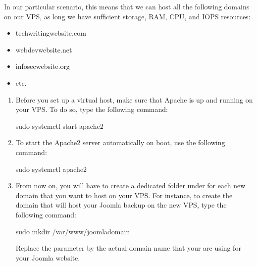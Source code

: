 \documentclass[letterpaper,10pt,english]{sphinxmanual}
\begin{document}
\sphinxAtStartPar
In our particular scenario, this means that we can host all the following domains on our VPS, as long we have sufficient storage, RAM, CPU, and IOPS resources:
\begin{itemize}
\item {} 
\sphinxAtStartPar
techwriting\sphinxhyphen{}website.com

\item {} 
\sphinxAtStartPar
webdev\sphinxhyphen{}website.net

\item {} 
\sphinxAtStartPar
infosec\sphinxhyphen{}website.org

\item {} 
\sphinxAtStartPar
etc.

\end{itemize}
\begin{enumerate}
%
\item {} 
\sphinxAtStartPar
Before you set up a virtual host, make sure that Apache is up and running on your VPS. To do so, type the following command:

\begin{sphinxVerbatim}[commandchars=\\\{\}]
\PYGZdl{} sudo systemctl start apache2
\end{sphinxVerbatim}

\item {} 
\sphinxAtStartPar
To start the Apache2 server automatically on boot, use the following command:

\begin{sphinxVerbatim}[commandchars=\\\{\}]
\PYGZdl{} sudo systemctl  apache2
\end{sphinxVerbatim}

\item {} 
\sphinxAtStartPar
From now on, you will have to create a dedicated folder under  for each new domain that you want to host on your VPS. For instance, to create the domain that will host your Joomla backup on the new VPS, type the following command:

\begin{sphinxVerbatim}[commandchars=\\\{\}]
\PYGZdl{} sudo mkdir /var/www/joomla\PYGZhy{}domain
\end{sphinxVerbatim}

\sphinxAtStartPar
Replace the parameter  by the actual domain name that your are using for your Joomla website.


\end{enumerate}
\end{document}
